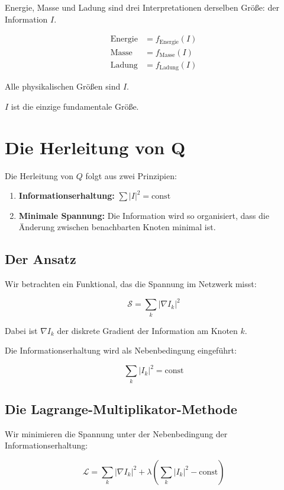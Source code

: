 Energie, Masse und Ladung sind drei Interpretationen derselben Größe: der Information \( I \).

\[
\begin{aligned}
\text{Energie} &= f_{\text{Energie}}(I) \\
\text{Masse} &= f_{\text{Masse}}(I) \\
\text{Ladung} &= f_{\text{Ladung}}(I)
\end{aligned}
\]

Alle physikalischen Größen sind \( I \).

\( I \) ist die einzige fundamentale Größe.

\section{Die Herleitung von Q}

Die Herleitung von \( Q \) folgt aus zwei Prinzipien:

\begin{enumerate}
\item \textbf{Informationserhaltung:} \( \sum |I|^2 = \text{const} \)
\item \textbf{Minimale Spannung:} Die Information wird so organisiert, dass die Änderung zwischen benachbarten Knoten minimal ist.
\end{enumerate}

\subsection{Der Ansatz}

Wir betrachten ein Funktional, das die Spannung im Netzwerk misst:

\[
\mathcal{S} = \sum_k |\nabla I_k|^2
\]

Dabei ist \( \nabla I_k \) der diskrete Gradient der Information am Knoten \( k \).

Die Informationserhaltung wird als Nebenbedingung eingeführt:

\[
\sum_k |I_k|^2 = \text{const}
\]

\subsection{Die Lagrange-Multiplikator-Methode}

Wir minimieren die Spannung unter der Nebenbedingung der Informationserhaltung:

\[
\mathcal{L} = \sum_k |\nabla I_k|^2 + \lambda \left( \sum_k |I_k|^2 - \text{const} \right)
\]

